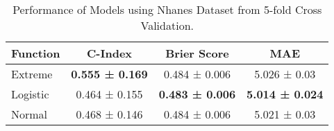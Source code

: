 \begin{table}[h!]
\centering
\caption{Performance of Models using Nhanes Dataset from 5-fold Cross Validation.}
\label{tab:model_performance_nhanes_0}
\begin{tabular}{l|c|c|c}
\hline
\textbf{Function} & \textbf{C-Index} & \textbf{Brier Score} & \textbf{MAE} \\
\hline
Extreme & \textbf{0.555 ± 0.169} & 0.484 ± 0.006 & 5.026 ± 0.03 \\
Logistic & 0.464 ± 0.155 & \textbf{0.483 ± 0.006} & \textbf{5.014 ± 0.024} \\
Normal & 0.468 ± 0.146 & 0.484 ± 0.006 & 5.021 ± 0.03 \\
\hline
\end{tabular}
\end{table}
